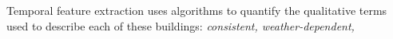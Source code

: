 Temporal feature extraction uses algorithms to quantify the qualitative terms used to describe each of these buildings: \emph{consistent, weather-dependent,}